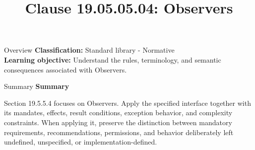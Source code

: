 \documentclass[10pt,letterpaper]{article}
\title{Clause 19.05.05.04: Observers}
\author{}
\date{}
\begin{document}
\maketitle
\begin{CornellOverviewBox}{Overview}
\textbf{Classification:} Standard library - Normative\\[2pt]
\textbf{Learning objective:} Understand the rules, terminology, and semantic consequences associated with Observers.
\end{CornellOverviewBox}\begin{CornellSummaryBox}{Summary}
{\sffamily\bfseries\color{Accent} Summary}\par\vspace{3pt}Section 19.5.5.4 focuses on Observers. Apply the specified interface together with its mandates, effects, result conditions, exception behavior, and complexity constraints. When applying it, preserve the distinction between mandatory requirements, recommendations, permissions, and behavior deliberately left undefined, unspecified, or implementation-defined.
\end{CornellSummaryBox}
\end{document}
